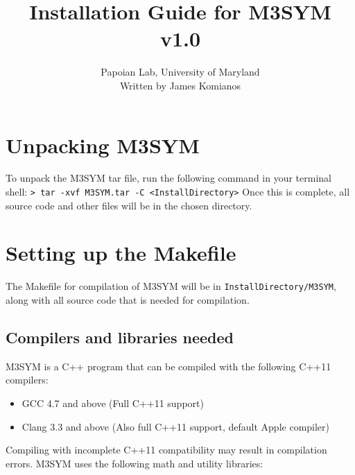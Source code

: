 \documentclass[11pt, oneside]{article}   	%
\title{Installation Guide for M3SYM v1.0}
\author{Papoian Lab, University of Maryland \\ Written by James Komianos}
\date{}							%
\begin{document}
\maketitle

\tableofcontents
\newpage

\section{Unpacking M3SYM}
 
 To unpack the M3SYM tar file, run the following command in your terminal shell: \newline \newline \indent\texttt{> tar -xvf M3SYM.tar -C <InstallDirectory>} \newline \newline Once this is complete, all source code and other files will be in the chosen directory.
 
 
\section{Setting up the Makefile}

The Makefile for compilation of M3SYM will be in \texttt{InstallDirectory/M3SYM}, along with all source code that is needed for compilation.

\subsection {Compilers and libraries needed}

M3SYM is a C++ program that can be compiled with the following C++11 compilers:

\begin{itemize}
\item GCC 4.7 and above (Full C++11 support)
\item  Clang 3.3 and above (Also full C++11 support, default Apple compiler)
\end{itemize}  

\noindent Compiling with incomplete C++11 compatibility may result in compilation errors. \newline M3SYM uses the following math and utility libraries:
\end{document}
